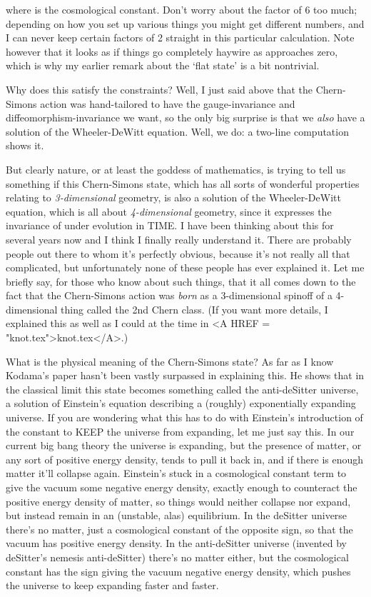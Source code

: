 where \Lambda  is the cosmological constant.  Don't worry
about the factor of 6 too much; depending on how you set up
various things you might get different numbers, and I can
never keep certain factors of 2 straight in this particular
calculation.  Note however that it looks as if things go 
completely haywire as \Lambda  approaches zero, which is why 
my earlier remark about the `flat state' is a bit nontrivial.  

Why does this satisfy the constraints?  Well, I just said above
that the Chern-Simons action was hand-tailored to have the
gauge-invariance and diffeomorphism-invariance we want, so the
only big surprise is that we \emph{also} have a solution of the
Wheeler-DeWitt equation.  Well, we do: a two-line computation
shows it.  

But clearly nature, or at least the goddess of mathematics, is
trying to tell us something if this Chern-Simons state, which
has all sorts of wonderful properties relating to \emph{3-dimensional}
geometry, is also a solution of the Wheeler-DeWitt equation, which
is all about \emph{4-dimensional} geometry, since it expresses
the invariance of \psi  under evolution in TIME.  I have been thinking
about this for several years now and I think I finally really
understand it.  There are probably people out there to whom it's
perfectly obvious, because it's not really all that complicated, but
unfortunately none of these people has ever explained it.  Let me briefly 
say, for those who know about such things, that it all comes down to 
the fact that the Chern-Simons action was \emph{born} as a 3-dimensional 
spinoff of a 4-dimensional thing called the 2nd Chern class.  (If you 
want more details, I explained this as well as I could at the time in 
<A HREF = "knot.tex">knot.tex</A>.)  

What is the physical meaning of the Chern-Simons state?  As far as
I know Kodama's paper hasn't been vastly surpassed in explaining
this.  He shows that in the classical limit this state becomes something
called the anti-deSitter universe, a solution of Einstein's equation
describing a (roughly) exponentially expanding universe.  If you are
wondering what this has to do with Einstein's introduction of the
constant to KEEP the universe from expanding, let me just say this.
In our current big bang theory the universe is expanding, but the
presence of matter, or any sort of positive energy density, tends to pull it
back in, and if there is enough matter it'll collapse again.  Einstein's
stuck in a cosmological constant term to give the vacuum some negative
energy density, exactly enough to counteract the positive energy
density of matter, so things would neither collapse nor expand,
but instead remain in an (unstable, alas) equilibrium.  In the deSitter
universe there's no matter, just a cosmological constant of the opposite 
sign, so that the vacuum has positive energy density.  In the anti-deSitter
universe (invented by deSitter's nemesis anti-deSitter) there's no matter
either, but the cosmological constant has the sign giving the vacuum 
negative energy density, which pushes the universe to keep expanding
faster and faster.  

